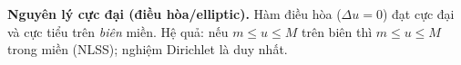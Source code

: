 \textbf{Nguyên lý cực đại (điều hòa/elliptic).}
Hàm điều hòa ($\Delta u=0$) đạt cực đại và cực tiểu trên \emph{biên} miền. Hệ quả: nếu $m\le u\le M$ trên biên thì $m\le u\le M$ trong miền (NLSS); nghiệm Dirichlet là duy nhất.
